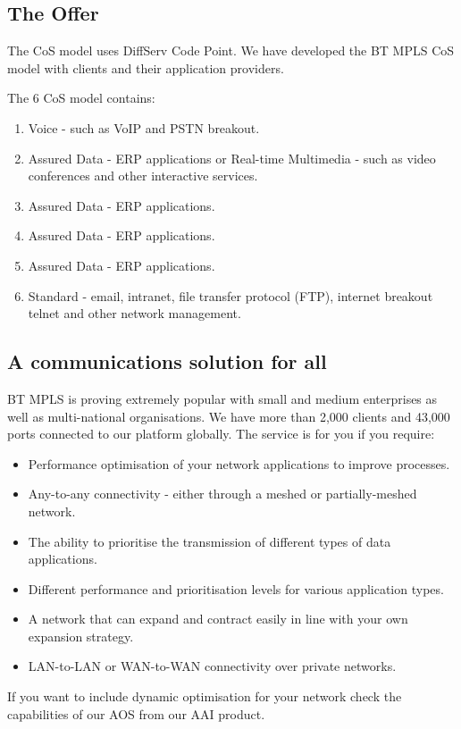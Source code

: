\subsection{The Offer}
The CoS model uses DiffServ Code Point. We have developed the BT MPLS CoS model with clients and their application providers.

The 6 CoS model contains:
\begin{enumerate}
\item Voice - such as VoIP and PSTN breakout.
\item Assured Data - ERP applications or Real-time Multimedia - such as video conferences and other interactive services.
\item Assured Data - ERP applications.
\item Assured Data - ERP applications.
\item Assured Data - ERP applications.
\item Standard - email, intranet, file transfer protocol (FTP), internet breakout telnet and other network management.
\end{enumerate}

\subsection{A communications solution for all}
BT MPLS is proving extremely popular with small and medium enterprises as well as multi-national organisations. We have more than 2,000 clients and 43,000 ports connected to our platform globally. The service is for you if you require:

\begin{itemize}
\item Performance optimisation of your network applications to improve processes.
\item Any-to-any connectivity - either through a meshed or partially-meshed network.
\item The ability to prioritise the transmission of different types of data applications.
\item Different performance and prioritisation levels for various application types.
\item A network that can expand and contract easily in line with your own expansion strategy.
\item LAN-to-LAN or WAN-to-WAN connectivity over private networks.
\end{itemize}

If you want to include dynamic optimisation for your network check the capabilities of our AOS from our AAI product.

